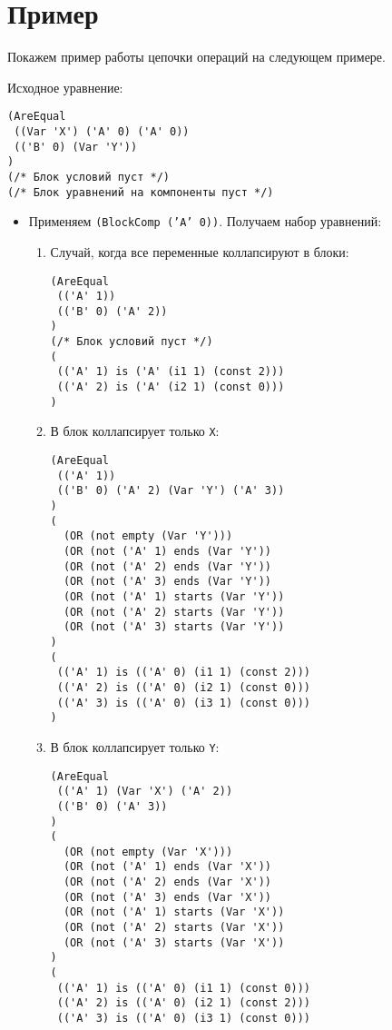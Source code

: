 \documentclass[12pt]{article}
\begin{document}
\section{Пример}

Покажем пример работы цепочки операций на следующем примере.

Исходное уравнение: 

\begin{verbatim}
(AreEqual 
 ((Var 'X') ('A' 0) ('A' 0)) 
 (('B' 0) (Var 'Y'))
)
(/* Блок условий пуст */)
(/* Блок уравнений на компоненты пуст */)
\end{verbatim}

\begin{itemize}

\item Применяем \texttt{(BlockComp ('A' 0))}. Получаем набор уравнений:
\begin{enumerate}
\item Случай, когда все переменные коллапсируют в блоки:
\begin{verbatim}
(AreEqual 
 (('A' 1)) 
 (('B' 0) ('A' 2))
)
(/* Блок условий пуст */)
( 
 (('A' 1) is ('A' (i1 1) (const 2))) 
 (('A' 2) is ('A' (i2 1) (const 0))) 
)
\end{verbatim}
\item В блок коллапсирует только \verb|X|:
\begin{verbatim}
(AreEqual 
 (('A' 1)) 
 (('B' 0) ('A' 2) (Var 'Y') ('A' 3))
)
(
  (OR (not empty (Var 'Y')))
  (OR (not ('A' 1) ends (Var 'Y'))
  (OR (not ('A' 2) ends (Var 'Y'))
  (OR (not ('A' 3) ends (Var 'Y'))
  (OR (not ('A' 1) starts (Var 'Y'))
  (OR (not ('A' 2) starts (Var 'Y'))
  (OR (not ('A' 3) starts (Var 'Y'))
)
( 
 (('A' 1) is (('A' 0) (i1 1) (const 2))) 
 (('A' 2) is (('A' 0) (i2 1) (const 0))) 
 (('A' 3) is (('A' 0) (i3 1) (const 0))) 
)
\end{verbatim}
\item В блок коллапсирует только \verb|Y|:
\begin{verbatim}
(AreEqual 
 (('A' 1) (Var 'X') ('A' 2)) 
 (('B' 0) ('A' 3))
)
(
  (OR (not empty (Var 'X')))
  (OR (not ('A' 1) ends (Var 'X'))
  (OR (not ('A' 2) ends (Var 'X'))
  (OR (not ('A' 3) ends (Var 'X'))
  (OR (not ('A' 1) starts (Var 'X'))
  (OR (not ('A' 2) starts (Var 'X'))
  (OR (not ('A' 3) starts (Var 'X'))
)
( 
 (('A' 1) is (('A' 0) (i1 1) (const 0))) 
 (('A' 2) is (('A' 0) (i2 1) (const 2))) 
 (('A' 3) is (('A' 0) (i3 1) (const 0))) 

\end{verbatim}
\end{enumerate}
\end{itemize}
\end{document}
